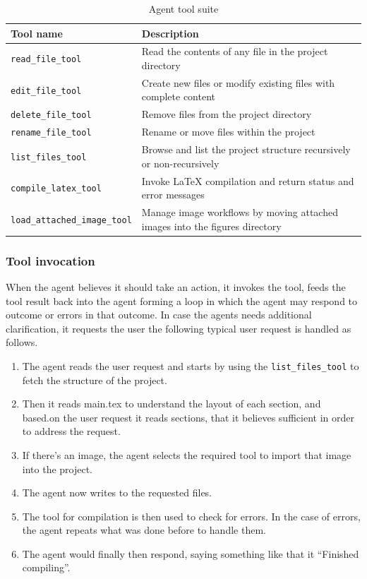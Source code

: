 \begin{table}[htbp]
\centering
\begin{tabular}{|l|p{8cm}|}
\hline
\textbf{Tool name} & \textbf{Description} \\
\hline
\texttt{read\_file\_tool} & Read the contents of any file in the project directory \\
\hline
\texttt{edit\_file\_tool} & Create new files or modify existing files with complete content \\
\hline
\texttt{delete\_file\_tool} & Remove files from the project directory \\
\hline
\texttt{rename\_file\_tool} & Rename or move files within the project \\
\hline
\texttt{list\_files\_tool} & Browse and list the project structure recursively or non-recursively \\
\hline
\texttt{compile\_latex\_tool} & Invoke LaTeX compilation and return status and error messages \\
\hline
\texttt{load\_attached\_image\_tool} & Manage image workflows by moving attached images into the figures directory \\
\hline
\end{tabular}
\caption{Agent tool suite}
\label{tab:agent_tools}
\end{table}

\subsubsection{Tool invocation}

When the agent believes it should take an action, it invokes the tool, feeds the tool result back into the agent forming a loop in which the agent may respond to outcome or errors in that outcome.
In case the agents needs additional clarification, it requests the user the following typical user request is handled as follows.

\begin{enumerate}
\item The agent reads the user request and starts by using the \texttt{list\_files\_tool} to fetch the structure of the project.
\item Then it reads main.tex to understand the layout of each section, and based.on the user request it reads sections, that it believes sufficient in order to address the request. 
\item If there's an image, the agent selects the required tool to import that image into the project.
\item The agent now writes to the requested files.
\item The tool for compilation is then used to check for errors.
In the case of errors, the agent repeats what was done before to handle them.
\item The agent would finally then respond, saying something like that it “Finished compiling”.
\end{enumerate}

